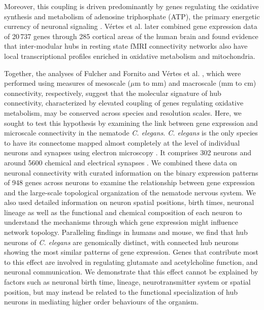 \documentclass[10pt,letterpaper]{article}
\begin{document}
Moreover, this coupling is driven predominantly by genes regulating the oxidative synthesis and metabolism of adenosine triphosphate (ATP), the primary energetic currency of neuronal signaling \cite{Lennie:2003ia, Laughlin:2003vu}.
V\'ertes et al. \cite{Vertes2016a} later combined gene expression data of 20\,737 genes through 285 cortical areas of the human brain and found evidence that inter-modular hubs in resting state fMRI connectivity networks also have local transcriptional profiles enriched in oxidative metabolism and mitochondria.

Together, the analyses of Fulcher and Fornito \cite{Fulcher:2016ck} and V\'ertes et al. \cite{Vertes2016a}, which were performed using measures of mesoscale ($\mu$m to mm) and macroscale (mm to cm) connectivity, respectively, suggest that the molecular signature of hub connectivity, characterized by elevated coupling of genes regulating oxidative metabolism, may be conserved across species and resolution scales.
Here, we sought to test this hypothesis by examining the link between gene expression and microscale connectivity in the nematode \emph{C. elegans}.
\emph{C. elegans} is the only species to have its connectome mapped almost completely at the level of individual neurons and synapses using electron microscopy \cite{White:1986tx, Varshney2011}.
It comprises 302 neurons and around 5600 chemical and electrical synapses \cite{White:1986tx}.
We combined these data on neuronal connectivity with curated information on the binary expression patterns of 948 genes across neurons to examine the relationship between gene expression and the large-scale topological organization of the nematode nervous system.
We also used detailed information on neuron spatial positions, birth times, neuronal lineage as well as the functional and chemical composition of each neuron to understand the mechanisms through which gene expression might influence network topology.
Paralleling findings in humans and mouse, we find that hub neurons of \emph{C. elegans} are genomically distinct, with connected hub neurons showing the most similar patterns of gene expression.
Genes that contribute most to this effect are involved in regulating glutamate and acetylcholine function, and neuronal communication.
We demonstrate that this effect cannot be explained by factors such as neuronal birth time, lineage, neurotransmitter system or spatial position, but may instead be related to the functional specialization of hub neurons in mediating higher order behaviours of the organism.
\end{document}
